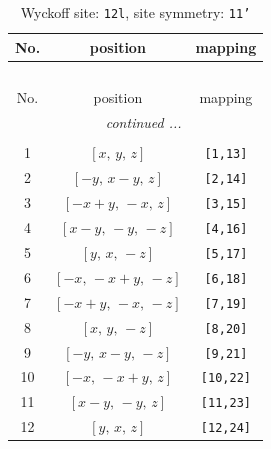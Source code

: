 \documentclass[fleqn,8pt]{jsarticle}
\begin{document}
\begin{longtable}{ccc}
\caption{Wyckoff site: {\tt 12l}, site symmetry: {\tt 11'}}
 \\
 \hline \hline
No. & position & mapping \\ \hline \endfirsthead

\multicolumn{2}{l}{\tablename\ \thetable{}} \\
 \hline \hline
No. & position & mapping \\ \hline \endhead

 \hline \hline
\multicolumn{2}{r}{\footnotesize\it continued ...} \\ \endfoot

 \hline \hline
\multicolumn{2}{r}{} \\ \endlastfoot

1 & $\left[ x,\, y,\, z \right]$ & {\tt [1,13]} \\ \hline
2 & $\left[ - y,\, x - y,\, z \right]$ & {\tt [2,14]} \\ \hline
3 & $\left[ - x + y,\, - x,\, z \right]$ & {\tt [3,15]} \\ \hline
4 & $\left[ x - y,\, - y,\, - z \right]$ & {\tt [4,16]} \\ \hline
5 & $\left[ y,\, x,\, - z \right]$ & {\tt [5,17]} \\ \hline
6 & $\left[ - x,\, - x + y,\, - z \right]$ & {\tt [6,18]} \\ \hline
7 & $\left[ - x + y,\, - x,\, - z \right]$ & {\tt [7,19]} \\ \hline
8 & $\left[ x,\, y,\, - z \right]$ & {\tt [8,20]} \\ \hline
9 & $\left[ - y,\, x - y,\, - z \right]$ & {\tt [9,21]} \\ \hline
10 & $\left[ - x,\, - x + y,\, z \right]$ & {\tt [10,22]} \\ \hline
11 & $\left[ x - y,\, - y,\, z \right]$ & {\tt [11,23]} \\ \hline
12 & $\left[ y,\, x,\, z \right]$ & {\tt [12,24]} \\
\end{longtable}
\end{document}
